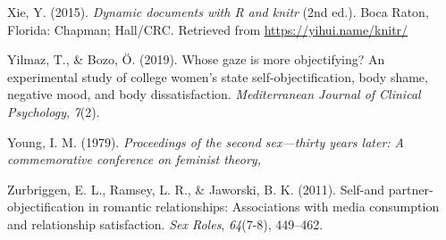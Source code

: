 \documentclass[
  man]{apa6}
\begin{document}
\leavevmode\hypertarget{ref-R-knitr}{}%
Xie, Y. (2015). \emph{Dynamic documents with R and knitr} (2nd ed.). Boca Raton, Florida: Chapman; Hall/CRC. Retrieved from \url{https://yihui.name/knitr/}

\leavevmode\hypertarget{ref-yilmaz2019whose}{}%
Yilmaz, T., \& Bozo, Ö. (2019). Whose gaze is more objectifying? An experimental study of college women's state self-objectification, body shame, negative mood, and body dissatisfaction. \emph{Mediterranean Journal of Clinical Psychology}, \emph{7}(2).

\leavevmode\hypertarget{ref-young1979}{}%
Young, I. M. (1979). \emph{Proceedings of the second sex---thirty years later: A commemorative conference on feminist theory,}

\leavevmode\hypertarget{ref-zurbriggen2011self}{}%
Zurbriggen, E. L., Ramsey, L. R., \& Jaworski, B. K. (2011). Self-and partner-objectification in romantic relationships: Associations with media consumption and relationship satisfaction. \emph{Sex Roles}, \emph{64}(7-8), 449--462.

\endgroup
\end{document}
